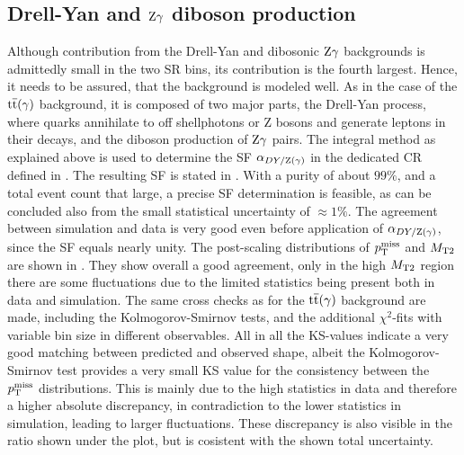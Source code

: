 \subsection{Drell-Yan and $\mathrm{Z}\gamma$ diboson production}
Although contribution from the Drell-Yan and dibosonic $\mathrm{Z}\gamma$ backgrounds is admittedly small in the two SR bins, its contribution is the fourth largest. Hence, it needs to be assured, that the background is modeled well. As in the case of the ${\mathrm{t}\overline{\mathrm{t}}}(\gamma)$ background, it is composed of two major parts, the Drell-Yan process, where quarks annihilate to off shellphotons or Z bosons and generate leptons in their decays, and the diboson production of $\mathrm{Z}\gamma$ pairs. The integral method as explained above is used to determine the SF $\alpha_{DY/\mathrm{Z}(\gamma)}$ in the dedicated CR defined in .
The resulting SF is stated in . With a purity of about $99\%$, and a total event count that large, a precise SF determination is feasible, as can be concluded also from the small statistical uncertainty of $\approx1\%$. The agreement between simulation and data is very good even before application of $\alpha_{DY/\mathrm{Z}(\gamma)}$, since the SF equals nearly unity. The post-scaling distributions of $p_{\mathrm{T}}^\text{miss}$ and $M_{\mathrm{T2}}$ are shown in . They show overall a good agreement, only in the high $M_{\mathrm{T2}}$ region there are some fluctuations due to the limited statistics being present both in data and simulation.
The same cross checks as for the ${\mathrm{t}\overline{\mathrm{t}}}(\gamma)$ background are made, including the Kolmogorov-Smirnov tests, and the additional $\chi^2$-fits with variable bin size in different observables.
All in all the KS-values indicate a very good matching between predicted and observed shape, albeit the Kolmogorov-Smirnov test provides a very small KS value for the consistency between the $p_{\mathrm{T}}^\text{miss}$ distributions. This is mainly due to the high statistics in data and therefore a higher absolute discrepancy, in contradiction to the lower statistics in simulation, leading to larger fluctuations. These discrepancy is also visible in the ratio shown under the plot, but is cosistent with the shown total uncertainty.\\
